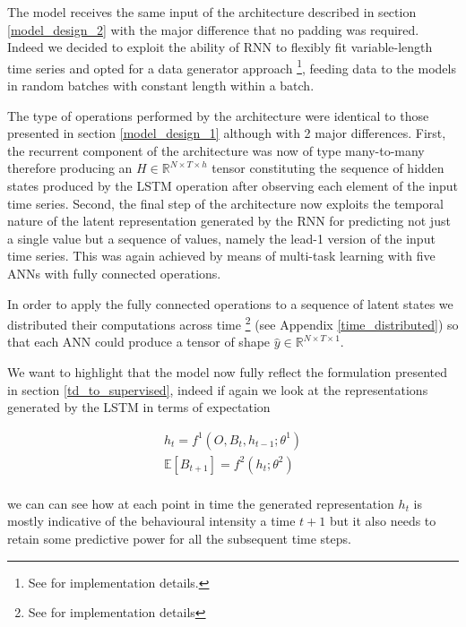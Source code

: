 

The model receives the same input of the architecture described in section \ref{model_design_2} with the major difference that no padding was required. Indeed we decided to exploit the ability of RNN to flexibly fit variable-length time series and opted for a data generator approach \footnote{See \cite{chollet2015keras,tensorflow2015-whitepaper} for implementation details.}, feeding data to the models in random batches with constant length within a batch. 

The type of operations performed by the architecture were identical to those presented in section \ref{model_design_1} although with 2 major differences. First, the recurrent component of the architecture was now of type many-to-many therefore producing an $H \in \mathbb{R}^{N \times T \times h}$ tensor constituting the sequence of hidden states produced by the LSTM operation after observing each element of the input time series\cite{bengio2017deep}. Second, the final step of the architecture now exploits the temporal nature of the latent representation generated by the RNN for predicting not just a single value but a sequence of values, namely the lead-1 version of the input time series. This was again achieved by means of multi-task learning with five ANNs with fully connected operations. 

In order to apply the fully connected operations to a sequence of latent states we distributed their computations across time \footnote{See \cite{chollet2015keras} for implementation details} (see Appendix \ref{time_distributed}) so that each ANN could produce a tensor of shape $\hat{y} \in \mathbb{R}^{N \times T \times 1}$. 

We want to highlight that the model now fully reflect the formulation presented in section \ref{td_to_supervised}, indeed if again we look at the representations generated by the LSTM in terms of expectation

\begin{gather}
\label{rnn_1_exp}
   h_t = f^1(O, B_{t}, h_{t-1}; \theta^1)  \\ \nonumber
   \mathbb{E}[B_{t+1}] = f^2(h_t; \theta^2) \\ \nonumber    
\end{gather}

we can can see how at each point in time the generated representation $h_t$ is mostly indicative of the behavioural intensity a time $t+1$ but it also needs to retain some predictive power for all the subsequent time steps. 

